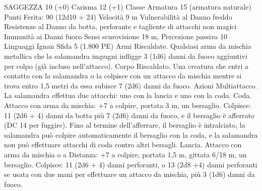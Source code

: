 \begin{multicols}{2}
SAGGEZZA 10 (+0)
Carisma 12 (+1)
Classe Armatura 15 (armatura naturale)
\hspace*{0pt}\hfill{Punti Ferita}: 90 (12d10 + 24)
Velocità 9 m
Vulnerabilità al Danno freddo
Resistenze al Danno da botta, perforante e tagliente di
attacchi non magici
Immunità ai Danni fuoco
Sensi scurovisione 18 m, Percezione passiva 10
Linguaggi Ignan
Sfida 5 (1.800 PE)
Armi Riscaldate. Qualsiasi arma da mischia metallica che la
salamandra impugni infligge 3 (1d6) danni da fuoco aggiuntivi
per colpo (già incluso nell’attacco).
Corpo Riscaldato. Una creatura che entri a contatto con la
salamandra o la colpisce con un attacco da mischia mentre si
trova entro 1,5 metri da essa subisce 7 (2d6) danni da fuoco.
Azioni
Multiattacco. La salamandra effettua due attacchi: uno con la
lancia e uno con la coda.
Coda. Attacco con arma da mischia: +7 a colpire, portata 3 m,
un bersaglio.
Colpisce: 11 (2d6 + 4) danni da botta più 7 (2d6) danni da
fuoco, e il bersaglio è afferrato (DC 14 per fuggire). Fino al
termine dell’afferrare, il bersaglio è intralciato, la salamandra
può colpire automaticamente il bersaglio con la coda, e la
salamandra non può effettuare attacchi di coda contro altri
bersagli.
Lancia. Attacco con arma da mischia o a Distanza: +7 a colpire,
portata 1,5 m, gittata 6/18 m, un bersaglio.
Colpisce: 11 (2d6 + 4) danni perforanti, o 13 (2d8 +4) danni
perforanti se usata con due mani per effettuare un attacco da
mischia, più 3 (1d6) danni da fuoco.
 

\end{multicols}
